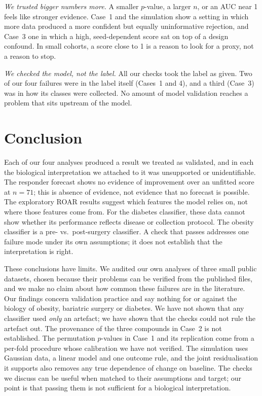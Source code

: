 \documentclass[conference]{IEEEtran}
\begin{document}
\emph{We trusted bigger numbers more.} A smaller $p$-value, a larger $n$, or
an AUC near 1 feels like stronger evidence. Case~1 and the simulation show a
setting in which more data produced a more confident but equally
uninformative rejection, and Case~3 one in which a high, seed-dependent
score sat on top of a design confound. In small cohorts, a score close to 1
is a reason to look for a proxy, not a reason to stop.

\emph{We checked the model, not the label.} All our checks took the label as
given. Two of our four failures were in the label itself (Cases~1 and 4),
and a third (Case~3) was in how its classes were collected. No amount of
model validation reaches a problem that sits upstream of the model.

\section{Conclusion}
\label{sec:conclusion}

Each of our four analyses produced a result we treated as validated, and in
each the biological interpretation we attached to it was unsupported or
unidentifiable. The responder forecast shows no evidence of improvement over
an unfitted score at $n=71$; this is absence of evidence, not evidence that
no forecast is possible. The exploratory ROAR results suggest which features
the model relies on, not where those features come from. For the diabetes
classifier, these data cannot show whether its performance reflects disease
or collection protocol. The obesity classifier is a pre- vs.\ post-surgery
classifier. A check that passes addresses one failure mode under its own
assumptions; it does not establish that the interpretation is right.

These conclusions have limits. We audited our own analyses of three small
public datasets, chosen because their problems can be verified from the
published files, and we make no claim about how common these failures are in
the literature. Our findings concern validation practice and say nothing for
or against the biology of obesity, bariatric surgery or diabetes. We have
not shown that any classifier used \emph{only} an artefact; we have shown
that the checks could not rule the artefact out. The provenance of the three
compounds in Case~2 is not established. The permutation $p$-values in
Case~1 and its replication come from a per-fold procedure whose calibration
we have not verified. The simulation uses Gaussian data, a linear model and
one outcome rule, and the joint residualisation it supports also removes any
true dependence of change on baseline. The checks we discuss can be useful
when matched to their assumptions and target; our point is that passing
them is not sufficient for a biological interpretation.
\end{document}
